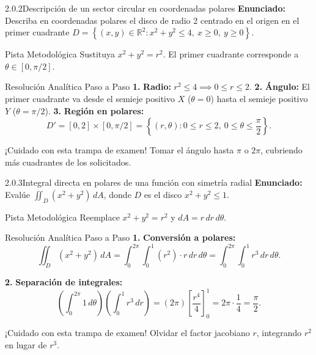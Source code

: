 \documentclass[11pt,a4paper]{article}
\begin{document}
\begin{nivelbox}{2.0.2}{Descripción de un sector circular en coordenadas polares}
\textbf{Enunciado:}\\
Describa en coordenadas polares el disco de radio 2 centrado en el origen en el primer cuadrante $D = \left\{ (x,y) \in \mathbb{R}^2 : x^2 + y^2 \le 4, \ x \ge 0, \ y \ge 0 \right\}$.

\begin{observacionbox}{Pista Metodológica}
Sustituya $x^2 + y^2 = r^2$. El primer cuadrante corresponde a $\theta \in [0, \pi/2]$.
\end{observacionbox}

\begin{ejerciciobox}{Resolución Analítica Paso a Paso}
\smallskip\noindent\textbf{1.} \textbf{Radio:} $r^2 \le 4 \implies 0 \le r \le 2$.
\smallskip\noindent\textbf{2.} \textbf{Ángulo:} El primer cuadrante va desde el semieje positivo $X$ ($\theta = 0$) hasta el semieje positivo $Y$ ($\theta = \pi/2$).
\smallskip\noindent\textbf{3.} \textbf{Región en polares:}
\[D' = [0, 2] \times [0, \pi/2] = \left\{ (r,\theta) : 0 \le r \le 2, \ 0 \le \theta \le \frac{\pi}{2} \right\}.\]
\end{ejerciciobox}

\begin{errorbox}{¡Cuidado con esta trampa de examen!}
Tomar el ángulo hasta $\pi$ o $2\pi$, cubriendo más cuadrantes de los solicitados.
\end{errorbox}
\end{nivelbox}
\bigskip

\begin{nivelbox}{2.0.3}{Integral directa en polares de una función con simetría radial}
\textbf{Enunciado:}\\
Evalúe $\iint_D (x^2 + y^2) \, dA$, donde $D$ es el disco $x^2 + y^2 \le 1$.

\begin{observacionbox}{Pista Metodológica}
Reemplace $x^2 + y^2 = r^2$ y $dA = r \, dr \, d\theta$.
\end{observacionbox}

\begin{ejerciciobox}{Resolución Analítica Paso a Paso}
\smallskip\noindent\textbf{1.} \textbf{Conversión a polares:}
\[\iint_D (x^2 + y^2) \, dA = \int_0^{2\pi} \int_0^1 (r^2) \cdot r \, dr \, d\theta = \int_0^{2\pi} \int_0^1 r^3 \, dr \, d\theta.\]

\smallskip\noindent\textbf{2.} \textbf{Separación de integrales:}
\[\left( \int_0^{2\pi} 1 \, d\theta \right) \left( \int_0^1 r^3 \, dr \right) = (2\pi) \left[ \frac{r^4}{4} \right]_0^1 = 2\pi \cdot \frac{1}{4} = \frac{\pi}{2}.\]
\end{ejerciciobox}

\begin{errorbox}{¡Cuidado con esta trampa de examen!}
Olvidar el factor jacobiano $r$, integrando $r^2$ en lugar de $r^3$.
\end{errorbox}
\end{nivelbox}
\bigskip
\end{document}
